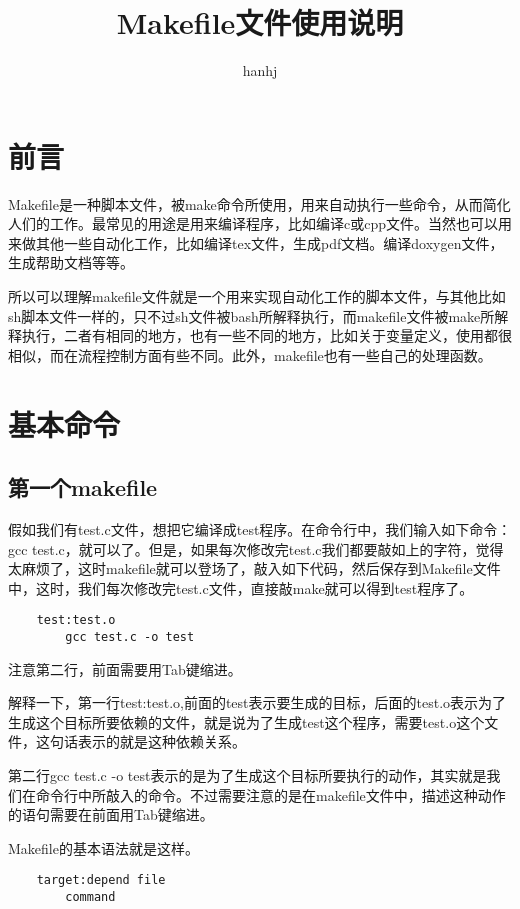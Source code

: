\documentclass{article}
\begin{document}
\begin{CJK}{UTF8}{gbsn}
\title{Makefile文件使用说明}
\author{hanhj}
\maketitle
	\section*{前言}
	Makefile是一种脚本文件，被make命令所使用，用来自动执行一些命令，从而简化人们的工作。最常见的用途是用来编译程序，比如编译c或cpp文件。当然也可以用来做其他一些自动化工作，比如编译tex文件，生成pdf文档。编译doxygen文件，生成帮助文档等等。
	\par
	所以可以理解makefile文件就是一个用来实现自动化工作的脚本文件，与其他比如sh脚本文件一样的，只不过sh文件被bash所解释执行，而makefile文件被make所解释执行，二者有相同的地方，也有一些不同的地方，比如关于变量定义，使用都很相似，而在流程控制方面有些不同。此外，makefile也有一些自己的处理函数。
	\section{基本命令}
	\subsection {第一个makefile}
	\par
		假如我们有test.c文件，想把它编译成test程序。在命令行中，我们输入如下命令：gcc test.c，就可以了。但是，如果每次修改完test.c我们都要敲如上的字符，觉得太麻烦了，这时makefile就可以登场了，敲入如下代码，然后保存到Makefile文件中，这时，我们每次修改完test.c文件，直接敲make就可以得到test程序了。
	\begin{lstlisting}
	test:test.o
		gcc test.c -o test
	\end{lstlisting}
	注意第二行，前面需要用Tab键缩进。
	\par
		解释一下，第一行test:test.o,前面的test表示要生成的目标，后面的test.o表示为了生成这个目标所要依赖的文件，就是说为了生成test这个程序，需要test.o这个文件，这句话表示的就是这种依赖关系。  
	\par
	第二行gcc test.c -o test表示的是为了生成这个目标所要执行的动作，其实就是我们在命令行中所敲入的命令。不过需要注意的是在makefile文件中，描述这种动作的语句需要在前面用Tab键缩进。
	\par 
	Makefile的基本语法就是这样。
	\begin{lstlisting}
	target:depend file
		command
	\end{lstlisting}


\end{CJK}
\end{document}
